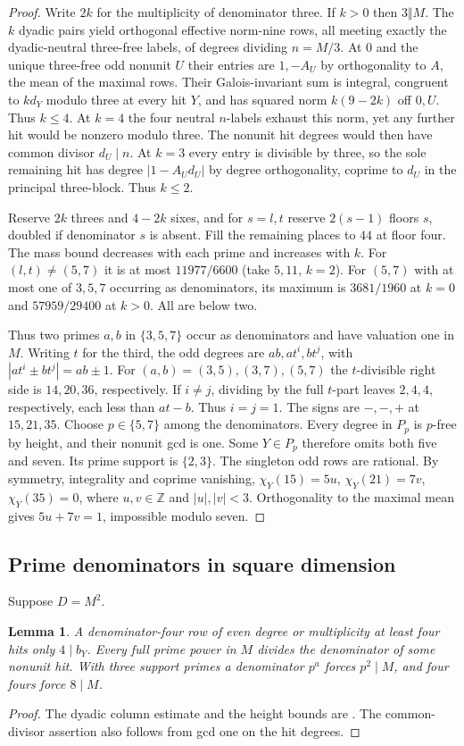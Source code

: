 \documentclass[11pt]{amsart}
\numberwithin{equation}{section}
\newtheorem{lemma}[theorem]{Lemma}
\theoremstyle{definition}
\theoremstyle{plain}
\newcommand{\ZZ}{\mathbb Z}
\begin{document}
\begin{proof}
Write $2k$ for the multiplicity of denominator three. If $k>0$ then
$3\Vert M$. The $k$ dyadic pairs yield orthogonal effective norm-nine
rows, all meeting exactly the dyadic-neutral three-free labels, of
degrees dividing $n=M/3$. At $0$ and the unique three-free odd
nonunit $U$ their entries are $1,-A_U$ by orthogonality to $A$,
the mean of the maximal rows. Their Galois-invariant sum is integral,
congruent to $k d_Y$ modulo three at every hit $Y$, and has squared
norm $k(9-2k)$ off $0,U$. Thus $k\le4$. At $k=4$ the four neutral
$n$-labels exhaust this norm, yet any further hit would be nonzero
modulo three. The nonunit hit degrees would then have common divisor
$d_U\mid n$. At $k=3$ every entry is divisible by three, so the
sole remaining hit has degree $|1-A_Ud_U|$ by degree orthogonality,
coprime to $d_U$ in the principal three-block. Thus $k\le2$.

Reserve $2k$ threes and $4-2k$ sixes, and for $s=l,t$ reserve
$2(s-1)$ floors $s$, doubled if denominator $s$ is absent. Fill
the remaining places to $44$ at floor four. The mass bound decreases
with each prime and increases with $k$. For $(l,t)\ne(5,7)$ it is
at most $11977/6600$ (take $5,11$, $k=2$). For $(5,7)$ with at
most one of $3,5,7$ occurring as denominators, its maximum is
$3681/1960$ at $k=0$ and $57959/29400$ at $k>0$. All are below two.

Thus two primes $a,b$ in $\{3,5,7\}$ occur as denominators and
have valuation one in $M$. Writing $t$ for the third, the odd
degrees are $ab,at^i,bt^j$, with $|at^i\pm bt^j|=ab\pm1$.
For $(a,b)=(3,5),(3,7),(5,7)$ the $t$-divisible right side is
$14,20,36$, respectively. If $i\ne j$, dividing by the full $t$-part
leaves $2,4,4$, respectively, each less than $at-b$. Thus $i=j=1$. The signs are $-,-,+$ at $15,21,35$.
Choose $p\in\{5,7\}$ among the denominators. Every degree in $P_p$
is $p$-free by height, and their nonunit gcd is one. Some $Y\in P_p$
therefore omits both five and seven. Its prime support is $\{2,3\}$.
The singleton odd rows are rational. By symmetry, integrality and
coprime vanishing, $\chi_Y(15)=5u$, $\chi_Y(21)=7v$, $\chi_Y(35)=0$,
where $u,v\in\ZZ$ and $|u|,|v|<3$. Orthogonality to the maximal
mean gives $5u+7v=1$, impossible modulo seven.
\end{proof}

\subsection{Prime denominators in square dimension}
Suppose $D=M^2$.
\begin{lemma}
A denominator-four row of even degree or multiplicity at least four
hits only $4\mid b_Y$. Every full prime power in $M$ divides the
denominator of some nonunit hit. With three support primes a denominator
$p^a$ forces $p^2\mid M$, and four fours force $8\mid M$.
\end{lemma}
\begin{proof}
The dyadic column estimate and the height bounds are
\cite[\S21.2 and Lemma~21.6]{BDPcore}. The common-divisor assertion
also follows from gcd one on the hit degrees.
\end{proof}
\end{document}

